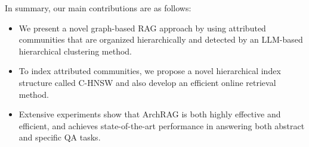 In summary, our main contributions are as follows:
\begin{itemize}%
    \item We present a novel graph-based RAG approach by using attributed communities that are organized hierarchically and detected by an LLM-based hierarchical clustering method.
    

    \item To index attributed communities, we propose a novel hierarchical index structure called C-HNSW and also develop an efficient online retrieval method.
    
    
    \item Extensive experiments show that ArchRAG is both highly effective and efficient, and achieves state-of-the-art performance in answering both abstract and specific QA tasks.
\end{itemize}



    


% 

% 
% 



